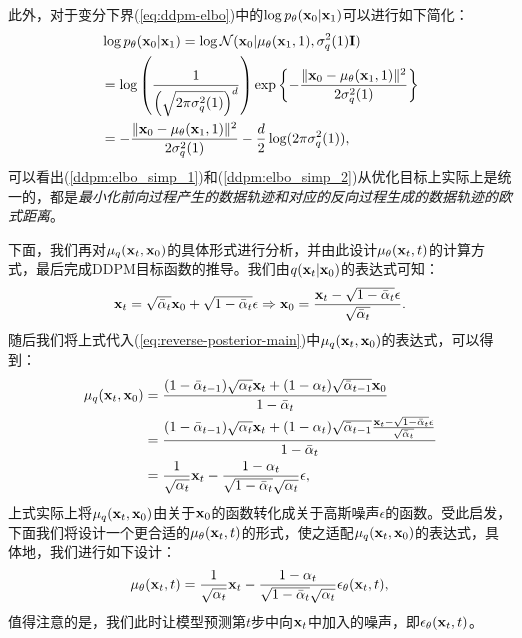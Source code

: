 \documentclass[11pt,a4paper,UTF8]{ctexart}
\begin{document}
此外，对于变分下界(\ref{eq:ddpm-elbo})中的$\log p_{\theta}(\mathbf{x}_0|\mathbf{x}_1)$可以进行如下简化：
\begin{align}
\begin{split}
&\log p_{\theta}(\mathbf{x}_0|\mathbf{x}_1) = \log \mathcal{N}(\mathbf{x}_0| \mu_{\theta}(\mathbf{x}_1,1),\sigma_q^2(1)\mathbf{I}) \\
&= \log \left( \frac{1}{\left(\sqrt{2\pi\sigma_q^2(1)} \right)^d} \right)\exp \left\{-\frac{\|\mathbf{x}_0 -\mu_{\theta}(\mathbf{x}_1,1) \|^2}{2\sigma_q^2(1)} \right\} \\
&= -\frac{\|\mathbf{x}_0 -\mu_{\theta}(\mathbf{x}_1,1) \|^2}{2\sigma_q^2(1)} -\frac{d}{2}\log (2\pi\sigma_q^2(1)),
\label{ddpm:elbo_simp_2}
\end{split}
\end{align}
可以看出(\ref{ddpm:elbo_simp_1})和(\ref{ddpm:elbo_simp_2})从优化目标上实际上是统一的，都是\emph{最小化前向过程产生的数据轨迹和对应的反向过程生成的数据轨迹的欧式距离}。

下面，我们再对$\mu_q(\mathbf{x}_t,\mathbf{x}_0)$的具体形式进行分析，并由此设计$\mu_{\theta}(\mathbf{x}_t,t)$的计算方式，最后完成DDPM目标函数的推导。我们由$q(\mathbf{x}_t|\mathbf{x}_0)$的表达式可知：
\begin{equation*}
    \mathbf{x}_t =\sqrt{\bar{\alpha}_t}\mathbf{x}_0 + \sqrt{1-\bar{\alpha}_t}\epsilon \Rightarrow  \mathbf{x}_0 =\frac{\mathbf{x}_t - \sqrt{1-\bar{\alpha}_t}\epsilon}{\sqrt{\bar{\alpha}_t}}.
\end{equation*}
随后我们将上式代入(\ref{eq:reverse-posterior-main})中$\mu_q(\mathbf{x}_t,\mathbf{x}_0)$的表达式，可以得到：
\begin{align}
\begin{split}
    \mu_q(\mathbf{x}_t,\mathbf{x}_0) &= \frac{(1-\bar{\alpha}_{t-1})\sqrt{\alpha_t}\mathbf{x}_t +(1-\alpha_t)\sqrt{\bar{\alpha}_{t-1}}\mathbf{x}_0 }{1-\bar{\alpha}_t} \\
    &= \frac{(1-\bar{\alpha}_{t-1})\sqrt{\alpha_t}\mathbf{x}_t +(1-\alpha_t)\sqrt{\bar{\alpha}_{t-1}}\frac{\mathbf{x}_t - \sqrt{1-\bar{\alpha}_t}\epsilon}{\sqrt{\bar{\alpha}_t}} }{1-\bar{\alpha}_t}\\
    &= \frac{1}{\sqrt{\alpha_t}}\mathbf{x}_t - \frac{1-\alpha_t}{\sqrt{1-\bar{\alpha}_t}\sqrt{\alpha_t}}\epsilon,
\end{split}
\label{ddpm:mu_q}
\end{align}
上式实际上将$\mu_q(\mathbf{x}_t,\mathbf{x}_0)$由关于$\mathbf{x}_0$的函数转化成关于高斯噪声$\epsilon$的函数。受此启发，下面我们将设计一个更合适的$\mu_{\theta}(\mathbf{x}_t,t)$的形式，使之适配$\mu_q(\mathbf{x}_t,\mathbf{x}_0)$的表达式，具体地，我们进行如下设计：
\begin{equation}
\mu_{\theta}(\mathbf{x}_t,t)=\frac{1}{\sqrt{\alpha_t}}\mathbf{x}_t - \frac{1-\alpha_t}{\sqrt{1-\bar{\alpha}_t}\sqrt{\alpha_t}}\epsilon_{\theta}(\mathbf{x}_t,t),
\label{ddpm:mu_theta}
\end{equation}
值得注意的是，我们此时让模型预测第$t$步中向$\mathbf{x}_t$中加入的噪声，即$\epsilon_{\theta}(\mathbf{x}_t,t)$。
\end{document}

